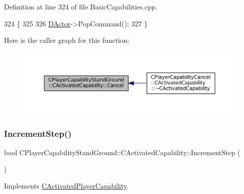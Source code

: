 Definition at line 324 of file Basic\+Capabilities.\+cpp.


\begin{DoxyCode}
324                                                              \{
325 
326     \hyperlink{classCActivatedPlayerCapability_a54ca944b47bff2718330639941d402b0}{DActor}->PopCommand();
327 \}
\end{DoxyCode}
Here is the caller graph for this function\+:\nopagebreak
\begin{figure}[H]
\begin{center}
\leavevmode
\includegraphics[width=350pt]{classCPlayerCapabilityStandGround_1_1CActivatedCapability_ac75cd8a26726adb60cf045f99059ca7d_icgraph}
\end{center}
\end{figure}
\hypertarget{classCPlayerCapabilityStandGround_1_1CActivatedCapability_ab4061171835e4c1008176e5765ded595}{}\label{classCPlayerCapabilityStandGround_1_1CActivatedCapability_ab4061171835e4c1008176e5765ded595} 
\subsubsection{\texorpdfstring{Increment\+Step()}{IncrementStep()}}
{\footnotesize\ttfamily bool C\+Player\+Capability\+Stand\+Ground\+::\+C\+Activated\+Capability\+::\+Increment\+Step (\begin{DoxyParamCaption}{ }\end{DoxyParamCaption})\hspace{0.3cm}{\ttfamily [virtual]}}



Implements \hyperlink{classCActivatedPlayerCapability_a943b5999a57504399293250382c0ec6a}{C\+Activated\+Player\+Capability}.



